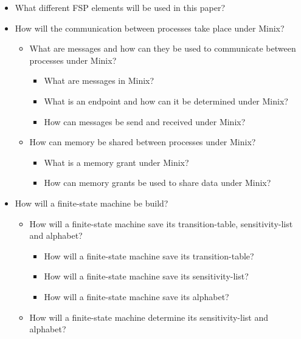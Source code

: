 \begin{itemize}
\tightlist
\item
  What different FSP elements will be used in this paper?
\item
  How will the communication between processes take place under Minix?

  \begin{itemize}
  \tightlist
  \item
    What are messages and how can they be used to communicate between
    processes under Minix?

    \begin{itemize}
    \tightlist
    \item
      What are messages in Minix?
    \item
      What is an endpoint and how can it be determined under Minix?
    \item
      How can messages be send and received under Minix?
    \end{itemize}
  \item
    How can memory be shared between processes under Minix?

    \begin{itemize}
    \tightlist
    \item
      What is a memory grant under Minix?
    \item
      How can memory grants be used to share data under Minix?
    \end{itemize}
  \end{itemize}
\item
  How will a finite-state machine be build?

  \begin{itemize}
  \tightlist
  \item
    How will a finite-state machine save its transition-table,
    sensitivity-list and alphabet?

    \begin{itemize}
    \tightlist
    \item
      How will a finite-state machine save its transition-table?
    \item
      How will a finite-state machine save its sensitivity-list?
    \item
      How will a finite-state machine save its alphabet?
    \end{itemize}
  \item
    How will a finite-state machine determine its sensitivity-list and
    alphabet?


\end{itemize}
\end{itemize}
